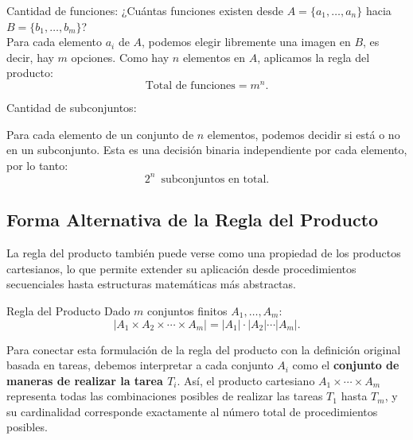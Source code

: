 \begin{exampleblock}{Cantidad de funciones:} 
¿Cuántas funciones existen desde $A = \{a_1, \ldots, a_n\}$ hacia $B = \{b_1, \ldots, b_m\}$?\\

Para cada elemento $a_i$ de $A$, podemos elegir libremente una imagen en $B$, es decir, hay $m$ opciones. Como hay $n$ elementos en $A$, aplicamos la regla del producto:
\[
\text{Total de funciones} = m^n.
\]
\end{exampleblock}

\begin{exampleblock}{Cantidad de subconjuntos:}

Para cada elemento de un conjunto de $n$ elementos, podemos decidir si está o no en un subconjunto. Esta es una decisión binaria independiente por cada elemento, por lo tanto:
\[
2^n \, \text{ subconjuntos en total.}
\]
\end{exampleblock}

\subsection{Forma Alternativa de la Regla del Producto}
La regla del producto también puede verse como una propiedad de los productos cartesianos, lo que permite extender su aplicación desde procedimientos secuenciales hasta estructuras matemáticas más abstractas.

\begin{definitionblock}{Regla del Producto}
Dado $m$ conjuntos finitos $A_1, \dots, A_m$:
\[
|A_1 \times A_2 \times \cdots \times A_m| = |A_1| \cdot |A_2| \cdots |A_m|.
\]
\end{definitionblock}

\medskip

Para conectar esta formulación de la regla del producto con la definición original basada en tareas, debemos interpretar a cada conjunto $A_i$ como el \textbf{conjunto de maneras de realizar la tarea $T_i$}. Así, el producto cartesiano $A_1 \times \cdots \times A_m$ representa todas las combinaciones posibles de realizar las tareas $T_1$ hasta $T_m$, y su cardinalidad corresponde exactamente al número total de procedimientos posibles.




